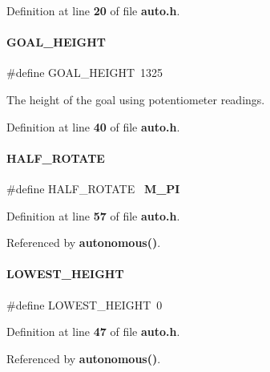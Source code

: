 Definition at line \textbf{ 20} of file \textbf{ auto.\+h}.

\mbox{\label{a00002_a83cf08759ac4ffc3ea6e3b7f9c406b3c}} 
\paragraph{G\+O\+A\+L\+\_\+\+H\+E\+I\+G\+HT}
{\footnotesize\ttfamily \#define G\+O\+A\+L\+\_\+\+H\+E\+I\+G\+HT~1325}



The height of the goal using potentiometer readings. 



Definition at line \textbf{ 40} of file \textbf{ auto.\+h}.

\mbox{\label{a00002_a57b89da6e342bd7556800463135d03ee}} 
\paragraph{H\+A\+L\+F\+\_\+\+R\+O\+T\+A\+TE}
{\footnotesize\ttfamily \#define H\+A\+L\+F\+\_\+\+R\+O\+T\+A\+TE~\textbf{ M\+\_\+\+PI}}



Definition at line \textbf{ 57} of file \textbf{ auto.\+h}.



Referenced by \textbf{ autonomous()}.

\mbox{\label{a00002_af364d4d51593fe601f20090221f9ddab}} 
\paragraph{L\+O\+W\+E\+S\+T\+\_\+\+H\+E\+I\+G\+HT}
{\footnotesize\ttfamily \#define L\+O\+W\+E\+S\+T\+\_\+\+H\+E\+I\+G\+HT~0}



Definition at line \textbf{ 47} of file \textbf{ auto.\+h}.



Referenced by \textbf{ autonomous()}.

